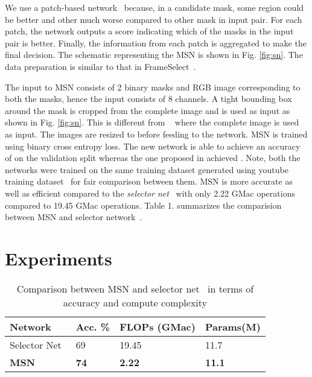 \documentclass[final]{cvpr}
\begin{document}
We use a patch-based network~\cite{isola2017image} because, in a candidate mask, some region could be better and other much worse compared to other mask in input pair. For each patch, the network outputs a score indicating which of the masks in the input pair is better. Finally, the information from each patch is aggregated to make the final decision. The schematic representing the MSN is shown in Fig. \ref{fig:sn}. The data preparation is similar to that in FrameSelect~\cite{garg2021mask}.

The input to MSN consists of 2 binary masks and RGB image corresponding to both the masks, hence the input consists of 8 channels. A tight bounding box around the mask is cropped from the complete image and is used as input as shown in Fig. \ref{fig:sn}.  This is different from ~\cite{garg2021mask} where the complete image is used as input. The images are resized to  before feeding to the network. MSN is trained using binary cross entropy loss. The new network  is able to achieve an accuracy of  on the validation split whereas the one proposed in \cite{garg2021mask} achieved . Note, both the networks were trained on the same training dataset generated using youtube training dataset~\cite{yang2019video} for fair comparison between them. MSN is more accurate as well as efficient compared to the \textit{selector net}~\cite{garg2021mask} with only 2.22 GMac operations compared to 19.45 GMac operations. Table 1. summarizes the comparision between MSN and selector network~\cite{garg2021mask}.



\section{Experiments}



\begin{table}[]
\begin{tabular}{llll}
\hline
Network      & Acc. \% & FLOPs (GMac) & Params(M) \\ \hline
Selector Net~\cite{garg2021mask} & 69          & 19.45        & 11.7       \\ \hline
\textbf{MSN}       & \textbf{74}          & \textbf{2.22 }        & \textbf{11.1}       \\ \hline

\end{tabular}

\caption{Comparison between MSN and selector net~\cite{garg2021mask} in terms of accuracy and compute complexity}
\label{tab:sn}
\end{table}
\end{document}
